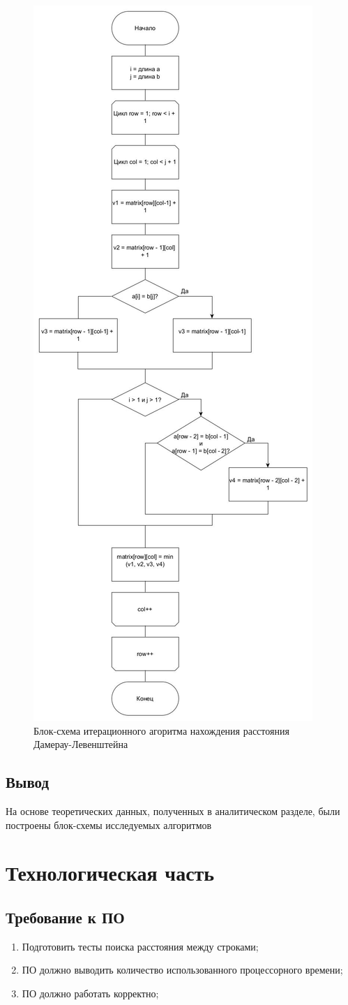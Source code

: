 \documentclass[12pt]{report}
\begin{document}
    \begin{figure}[H]
        \centering
        \includegraphics[width=0.4\linewidth]{img/levDamCasual}
        \caption{Блок-схема итерационного агоритма нахождения расстояния Дамерау-Левенштейна}
        \label{fig:levDamCasual}
    \end{figure}


    \section{Вывод}
    На основе теоретических данных, полученных в аналитическом разделе,
    были построены блок-схемы исследуемых алгоритмов


    \chapter{Технологическая часть}


    \section{Требование к ПО}
    \begin{enumerate}
        \item Подготовить тесты поиска расстояния между строками;
        \item ПО должно выводить количество использованного процессорного времени;
        \item ПО должно работать корректно;
    \end{enumerate}
\end{document}
